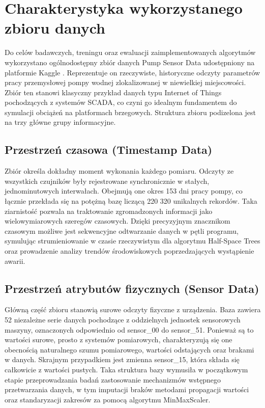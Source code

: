 \documentclass[12pt,twoside]{article}
\begin{document}
\section{Charakterystyka wykorzystanego zbioru danych}
Do celów badawczych, treningu oraz ewaluacji zaimplementowanych algorytmów wykorzystano ogólnodostępny zbiór danych Pump Sensor Data udostępniony na platformie Kaggle \cite{kaggledata}. Reprezentuje on rzeczywiste, historyczne odczyty parametrów pracy przemysłowej pompy wodnej zlokalizowanej w niewielkiej miejscowości. Zbiór ten stanowi klasyczny przykład danych typu Internet of Things pochodzących z systemów SCADA, co czyni go idealnym fundamentem do symulacji obciążeń na platformach brzegowych. Struktura zbioru podizelona jest na trzy główne grupy informacyjne.
\subsection{Przestrzeń czasowa (Timestamp Data)}
Zbiór określa dokładny moment wykonania każdego pomiaru. Odczyty ze wszystkich czujników były rejestrowane synchronicznie w stałych, jednominutowych interwałach. Obejmują one okres 153 dni pracy pompy, co łącznie przekłada się na potężną bazę liczącą 220 320 unikalnych rekordów. Taka ziarnistość pozwala na traktowanie zgromadzonych informacji jako wielowymiarowych szeregów czasowych. Dzięki precyzyjnym znacznikom czasowym możliwe jest sekwencyjne odtwarzanie danych w pętli programu, symulując strumieniowanie w czasie rzeczywistym dla algorytmu Half-Space Trees oraz prowadzenie analizy trendów środowiskowych poprzedzających wystąpienie awarii.
\subsection{Przestrzeń atrybutów fizycznych (Sensor Data)}
Główną część zbioru stanowią surowe odczyty fizyczne z urządzenia. Baza zawiera 52 niezależne serie danych pochodzące z oddzielnych jednostek sensorowych maszyny, oznaczonych odpowiednio od sensor\_00 do sensor\_51. Ponieważ są to wartości surowe, prosto z systemów pomiarowych, charakteryzują się one obecnością naturalnego szumu pomiarowego, wartości odstających oraz brakami w danych. Skrajnym przypadkiem jest zmienna sensor\_15, która składa się całkowicie z wartości pustych. Taka struktura bazy wymusiła w początkowym etapie przeprowadzania badań zastosowanie mechanizmów wstępnego przetwarzania danych, w tym imputacji braków metodami propagacji wartości  oraz standaryzacji zakresów za pomocą algorytmu MinMaxScaler.
\end{document}
